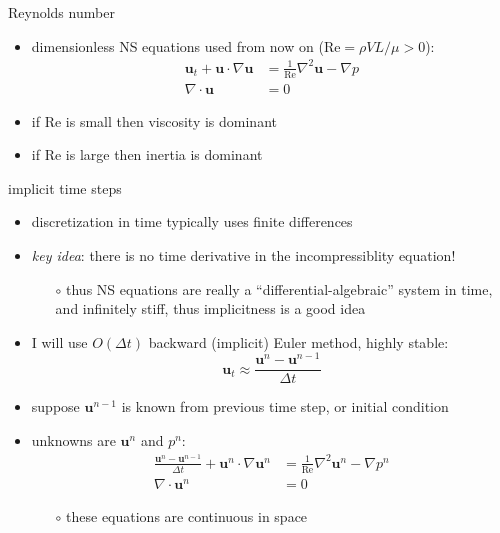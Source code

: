 \documentclass[10pt,hyperref]{beamer}
\newcommand{\bu}{\mathbf{u}}
\newcommand{\grad}{\nabla}
\newcommand{\Div}{\nabla\cdot}
\renewcommand{\Re}{\text{Re}}
\begin{document}
\begin{frame}{Reynolds number}

\begin{itemize}
\item dimensionless NS equations used from now on ($\Re = \rho V L/\mu > 0$):
\begin{align*}
\bu_t + \bu \cdot \grad \bu &= \frac{1}{\Re} \grad^2 \bu - \grad p \\
\Div \bu &= 0
\end{align*}
\item if $\Re$ is small then viscosity is dominant
\item if $\Re$ is large then inertia is dominant
\end{itemize}
\end{frame}


\begin{frame}{implicit time steps}

\begin{itemize}
\item discretization in time typically uses finite differences
\item \emph{key idea}: there is no time derivative in the incompressiblity equation!
    \begin{itemize}
    \item[$\circ$] thus NS equations are really a ``differential-algebraic'' system in time, and infinitely stiff, thus implicitness is a good idea
    \end{itemize}
\item I will use $O(\Delta t)$ backward (implicit) Euler method, highly stable:
	$$\bu_t \approx \frac{\bu^{n} - \bu^{n-1}}{\Delta t}$$
\item suppose $\bu^{n-1}$ is known from previous time step, or initial condition
\item unknowns are $\bu^n$ and $p^n$:
\begin{align*}
\frac{\bu^{n} - \bu^{n-1}}{\Delta t} + \bu^n \cdot \grad \bu^n &= \frac{1}{\Re}\grad^2 \bu^n - \grad p^n \\
\Div \bu^n &= 0
\end{align*}

    \begin{itemize}
    \item[$\circ$] these equations are continuous in space
    \end{itemize}
\end{itemize}
\end{frame}
\end{document}
